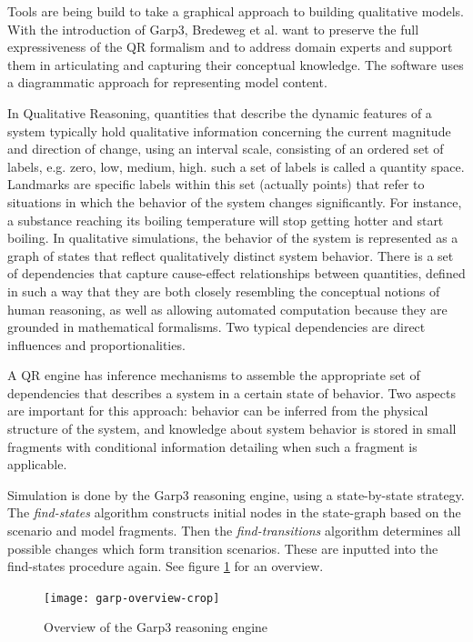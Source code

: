 \documentclass{article} %
\begin{document}
Tools are being build to take a graphical approach to building qualitative 
models. With the introduction of Garp3, Bredeweg et al. want to preserve the
full expressiveness of the QR formalism and to address domain experts and
support them in articulating and capturing their conceptual knowledge. The
software uses a diagrammatic approach for representing model content.

In Qualitative Reasoning, quantities that describe the dynamic features of a 
system typically hold qualitative information concerning the current magnitude 
and direction of change, using an interval scale, consisting of an ordered set 
of labels, e.g. {zero, low, medium, high}. such a set of labels
is called a quantity space. Landmarks are specific labels within this set
(actually points) that refer to situations in which the behavior of the system
changes significantly. For instance, a substance reaching its boiling
temperature will stop getting hotter and start boiling. In qualitative
simulations, the behavior of the system is represented as a graph of states
that reflect qualitatively distinct system behavior. There is a set of
dependencies that capture cause-effect relationships between quantities,
defined in such a way that they are both closely resembling the conceptual
notions of human reasoning, as well as allowing automated computation because
they are grounded in mathematical formalisms. Two typical dependencies are
direct influences and proportionalities.

A QR engine has inference mechanisms to assemble the appropriate set of
dependencies that describes a system in a certain state of behavior. Two
aspects are important for this approach: behavior can be inferred from the
physical structure of the system, and knowledge about system behavior is
stored in small fragments with conditional information detailing when such a
fragment is applicable.

\vspace{0.8em}

Simulation is done by the Garp3 reasoning engine, using a state-by-state
strategy. The \emph{find-states} algorithm constructs initial nodes in the 
state-graph based on the scenario and model fragments. Then the 
\emph{find-transitions} algorithm determines all possible changes which form 
transition scenarios. These are inputted into the find-states procedure again.  
See figure \ref{garp-overview} for an overview.

\begin{figure}
\centering
\texttt{[image: garp-overview-crop]}
\caption{Overview of the Garp3 reasoning engine}
\label{garp-overview}
\end{figure}
\end{document}

